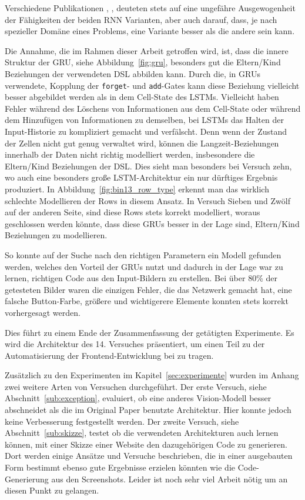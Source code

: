 \documentclass[pdftex,a4paper,halfparskip, article]{scrartcl}
\begin{document}
Verschiedene Publikationen \cite{paperGRUComparison}, \cite{lstmSearchSpace}, \cite{colahsBlogLSTM} deuteten stets auf eine ungefähre Ausgewogenheit der Fähigkeiten der beiden RNN Varianten, aber auch darauf, dass, je nach spezieller Domäne eines Problems, eine Variante besser als die andere sein kann.

Die Annahme, die im Rahmen dieser Arbeit getroffen wird, ist, dass die innere Struktur der GRU, siehe Abbildung~\ref{fig:gru}, besonders gut die Eltern/Kind Beziehungen der verwendeten DSL abbilden kann. Durch die, in GRUs verwendete, Kopplung der \texttt{forget}- und \texttt{add}-Gates kann diese Beziehung vielleicht besser abgebildet werden als in dem Cell-State des LSTMs. Vielleicht haben Fehler während des Löschens von Informationen aus dem Cell-State oder während dem Hinzufügen von Informationen zu demselben, bei LSTMs das Halten der Input-Historie zu kompliziert gemacht und verfälscht. Denn wenn der Zustand der Zellen nicht gut genug verwaltet wird, können die Langzeit-Beziehungen innerhalb der Daten nicht richtig modelliert werden, insbesondere die Eltern/Kind Beziehungen der DSL. Dies sieht man besonders bei Versuch zehn, wo auch eine besonders große LSTM-Architektur ein nur dürftiges Ergebnis produziert. In Abbildung~\ref{fig:bin13_row_type} erkennt man das wirklich schlechte Modellieren der Rows in diesem Ansatz. In Versuch Sieben und Zwölf auf der anderen Seite, sind diese Rows stets korrekt modelliert, woraus geschlossen werden könnte, dass diese GRUs besser in der Lage sind, Eltern/Kind Beziehungen zu modellieren. 

So konnte auf der Suche nach den richtigen Parametern ein Modell gefunden werden, welches den Vorteil der GRUs nutzt und dadurch in der Lage war zu lernen, richtigen Code aus den Input-Bildern zu erstellen. Bei über 80\% der getesteten Bilder waren die einzigen Fehler, die das Netzwerk gemacht hat, eine falsche Button-Farbe, größere und wichtigerere Elemente konnten stets korrekt vorhergesagt werden. 

Dies führt zu einem Ende der Zusammenfassung der getätigten Experimente. Es wird die Architektur des 14. Versuches präsentiert, um einen Teil zu der Automatisierung der Frontend-Entwicklung bei zu tragen.

Zusätzlich zu den Experimenten im Kapitel~\ref{sec:experimente} wurden im Anhang zwei weitere Arten von Versuchen durchgeführt. Der erste Versuch, siehe Abschnitt~\ref{sub:exception}, evaluiert, ob eine anderes Vision-Modell besser abschneidet als die im Original Paper benutzte Architektur. Hier konnte jedoch keine Verbesserung festgestellt werden. 
Der zweite Versuch, siehe Abschnitt~\ref{sub:skizze}, testet ob die verwendeten Architekturen auch lernen können, mit einer Skizze einer Website den dazugehörigen Code zu generieren. Dort werden einige Ansätze und Versuche beschrieben, die in einer ausgebauten Form bestimmt ebenso gute Ergebnisse erzielen könnten wie die Code-Generierung aus den Screenshots. Leider ist noch sehr viel Arbeit nötig um an diesen Punkt zu gelangen.
\end{document}
